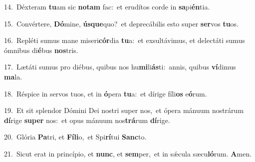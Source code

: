 {\numbfont\textcolor{\numbcolor}{14.}}~Déxteram \textbf{tu}\-am sic \textbf{no}\-\textbf{tam} fac:~\star et erudítos corde in \textbf{sa}\-pi\-\textbf{én}\-tia.\par
{\numbfont\textcolor{\numbcolor}{15.}}~Convértere, \textbf{Dó}\-mine, \textbf{ús}\-\textbf{que}quo?~\star et deprecábilis esto super \textbf{ser}\-vos \textbf{tu}\-os.\par
{\numbfont\textcolor{\numbcolor}{16.}}~Repléti sumus mane miseri\-\textbf{cór}\-dia \textbf{tu}\-a:~\star et exsultávimus, et delectáti sumus ómnibus di\-\textbf{é}\-bus \textbf{nos}\-tris.\par
{\numbfont\textcolor{\numbcolor}{17.}}~Lætáti sumus pro diébus, quibus nos hu\-\textbf{mi}\-li\-\textbf{ás}\-ti:~\star annis, quibus \textbf{ví}\-dimus \textbf{ma}\-la.\par
{\numbfont\textcolor{\numbcolor}{18.}}~Réspice in servos tuos, et in \textbf{ó}\-pera \textbf{tu}\-a:~\star et dírige fíli\textbf{os} e\-\textbf{ó}\-rum.\par
{\numbfont\textcolor{\numbcolor}{19.}}~Et sit splendor Dómini Dei nostri super nos,~\dagger et ópera mánuum nostrárum \textbf{dí}\-rige \textbf{su}\-\textbf{per} nos:~\star et opus mánuum nos\-\textbf{trá}\-rum \textbf{dí}\-rige.\par
{\numbfont\textcolor{\numbcolor}{20.}}~Glória \textbf{Pa}\-tri, et \textbf{Fí}\-\textbf{li}o,~\star et Spi\-\textbf{rí}\-tui \textbf{Sanc}\-to.\par
{\numbfont\textcolor{\numbcolor}{21.}}~Sicut erat in princípio, et \textbf{nunc}\-, et \textbf{sem}\-per,~\star et in sǽcula sæcu\-\textbf{ló}\-rum. \textbf{A}\-men.\par
